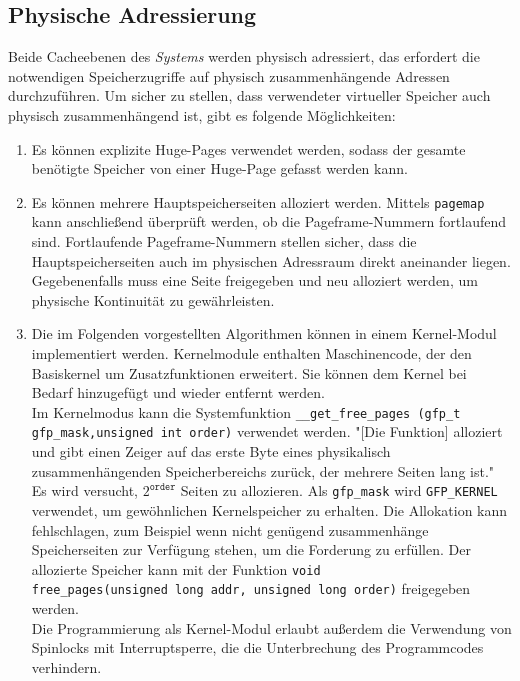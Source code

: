 \documentclass[]{scrbook}
\begin{document}
\subsection{Physische Adressierung} \label{impl}

Beide Cacheebenen des \textsl{\gls{System}s} werden physisch adressiert, das erfordert die notwendigen Speicherzugriffe auf physisch zusammenhängende Adressen durchzuführen. 
Um sicher zu stellen, dass verwendeter virtueller Speicher auch physisch zusammenhängend ist, gibt es folgende Möglichkeiten:

\begin{enumerate}
\item Es können explizite Huge-Pages verwendet werden, sodass der gesamte benötigte Speicher von einer Huge-Page gefasst werden kann.

\item Es können mehrere Hauptspeicherseiten alloziert werden. Mittels \texttt{pagemap} \cite{pagemap} kann anschließend überprüft werden, ob die Pageframe-Nummern fortlaufend sind. 
Fortlaufende Pageframe-Nummern stellen sicher, dass die Hauptspeicherseiten auch im physischen Adressraum direkt aneinander liegen. 
Gegebenenfalls muss eine Seite freigegeben und neu alloziert werden, um physische Kontinuität zu gewährleisten.

\item Die im Folgenden vorgestellten Algorithmen können in einem Kernel-Modul implementiert werden.
Kernelmodule enthalten Maschinencode, der den Basiskernel um Zusatzfunktionen erweitert.
Sie können dem Kernel bei Bedarf hinzugefügt und wieder entfernt werden. \cite{lkm}
\\
Im Kernelmodus kann die Systemfunktion
\texttt{\_\_get\_free\_pages (gfp\_t gfp\_mask,\newline unsigned int order)} verwendet werden.
"[Die Funktion] alloziert und gibt einen Zeiger auf das erste Byte eines physikalisch zusammenhängenden Speicherbereichs zurück, der mehrere Seiten lang ist." \cite[S.\,230]{gfp1}
Es wird versucht, $2^{\texttt{order}}$ Seiten zu allozieren. Als \texttt{gfp\_mask} wird \texttt{GFP\_KERNEL} verwendet, um gewöhnlichen Kernelspeicher zu erhalten. Die Allokation kann fehlschlagen, zum Beispiel wenn nicht genügend zusammenhänge Speicherseiten zur Verfügung stehen, um die Forderung zu erfüllen. Der allozierte Speicher kann mit der Funktion \texttt{void\\free\_pages(unsigned long addr, unsigned long order)} freigegeben werden. \cite[S.\,231]{gfp1}
\\ 
Die Programmierung als Kernel-Modul erlaubt außerdem die Verwendung von Spinlocks mit Interruptsperre, die die Unterbrechung des Programmcodes verhindern.

\end{enumerate} 
\end{document}
